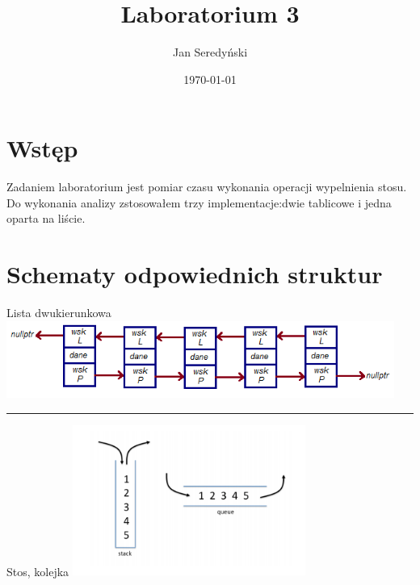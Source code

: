 \documentclass[11pt]{article}
\begin{document}
\title{Laboratorium 3}
\author{Jan Seredyński}
\date{\today}
\maketitle

\section{Wstęp}
Zadaniem laboratorium jest pomiar czasu wykonania operacji wypelnienia stosu. Do wykonania analizy zstosowałem trzy implementacje:dwie tablicowe i jedna oparta na liście.


\section{Schematy odpowiednich struktur}

Lista dwukierunkowa
\includegraphics[width=5in]{lista2_1.png} 
\par\vspace{\baselineskip}
\hrule
\par\vspace{\baselineskip}
Stos, kolejka
\includegraphics[width=3in]{stackqueue.png} 
\newpage
\end{document}
